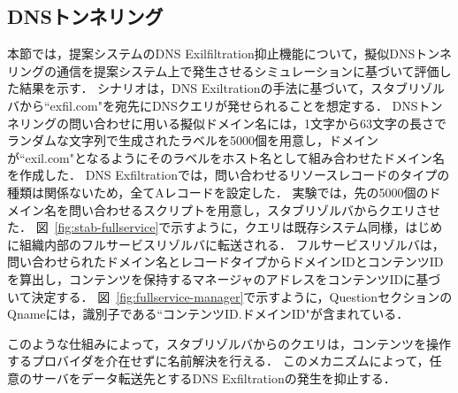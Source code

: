 \subsection{DNSトンネリング}
\label{sec:eval-tunnel}
本節では，提案システムのDNS Exilfiltration抑止機能について，擬似DNSトンネリングの通信を提案システム上で発生させるシミュレーションに基づいて評価した結果を示す．
シナリオは，DNS Exiltrationの手法に基づいて，スタブリゾルバから``exfil.com"を宛先にDNSクエリが発せられることを想定する．
DNSトンネリングの問い合わせに用いる擬似ドメイン名には，1文字から63文字の長さでランダムな文字列で生成されたラベルを5000個を用意し，ドメインが``exil.com"となるようにそのラベルをホスト名として組み合わせたドメイン名を作成した．
DNS Exfiltrationでは，問い合わせるリソースレコードのタイプの種類は関係ないため，全てAレコードを設定した．
実験では，先の5000個のドメイン名を問い合わせるスクリプトを用意し，スタブリゾルバからクエリさせた．
図~\ref{fig:stab-fullservice}で示すように，クエリは既存システム同様，はじめに組織内部のフルサービスリゾルバに転送される．
フルサービスリゾルバは，問い合わせられたドメイン名とレコードタイプからドメインIDとコンテンツIDを算出し，コンテンツを保持するマネージャのアドレスをコンテンツIDに基づいて決定する．
図~\ref{fig:fullservice-manager}で示すように，QuestionセクションのQnameには，識別子である``コンテンツID.ドメインID"が含まれている．

このような仕組みによって，スタブリゾルバからのクエリは，コンテンツを操作するプロバイダを介在せずに名前解決を行える．
このメカニズムによって，任意のサーバをデータ転送先とするDNS Exfiltrationの発生を抑止する．

